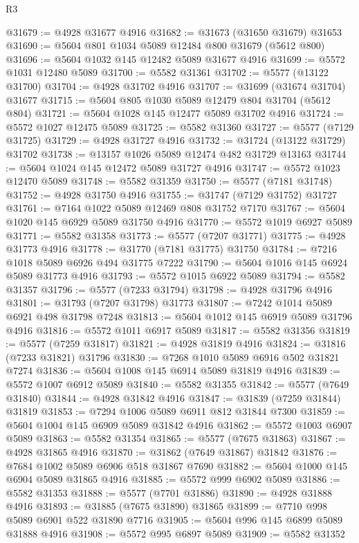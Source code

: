 \begin{lexlean}{R3}
\begin{coremodule}
@31679 := @4928 @31677 @4916
@31682 := @31673 (@31650 @31679) @31653
@31690 := @5604 @801 @1034 @5089 @12484 @800 @31679 (@5612 @800)
@31696 := @5604 @1032 @145 @12482 @5089 @31677 @4916
@31699 := @5572 @1031 @12480 @5089
@31700 := @5582 @31361
@31702 := @5577 (@13122 @31700)
@31704 := @4928 @31702 @4916
@31707 := @31699 (@31674 @31704) @31677
@31715 := @5604 @805 @1030 @5089 @12479 @804 @31704 (@5612 @804)
@31721 := @5604 @1028 @145 @12477 @5089 @31702 @4916
@31724 := @5572 @1027 @12475 @5089
@31725 := @5582 @31360
@31727 := @5577 (@7129 @31725)
@31729 := @4928 @31727 @4916
@31732 := @31724 (@13122 @31729) @31702
@31738 := @13157 @1026 @5089 @12474 @482 @31729 @13163
@31744 := @5604 @1024 @145 @12472 @5089 @31727 @4916
@31747 := @5572 @1023 @12470 @5089
@31748 := @5582 @31359
@31750 := @5577 (@7181 @31748)
@31752 := @4928 @31750 @4916
@31755 := @31747 (@7129 @31752) @31727
@31761 := @7164 @1022 @5089 @12469 @808 @31752 @7170
@31767 := @5604 @1020 @145 @6929 @5089 @31750 @4916
@31770 := @5572 @1019 @6927 @5089
@31771 := @5582 @31358
@31773 := @5577 (@7207 @31771)
@31775 := @4928 @31773 @4916
@31778 := @31770 (@7181 @31775) @31750
@31784 := @7216 @1018 @5089 @6926 @494 @31775 @7222
@31790 := @5604 @1016 @145 @6924 @5089 @31773 @4916
@31793 := @5572 @1015 @6922 @5089
@31794 := @5582 @31357
@31796 := @5577 (@7233 @31794)
@31798 := @4928 @31796 @4916
@31801 := @31793 (@7207 @31798) @31773
@31807 := @7242 @1014 @5089 @6921 @498 @31798 @7248
@31813 := @5604 @1012 @145 @6919 @5089 @31796 @4916
@31816 := @5572 @1011 @6917 @5089
@31817 := @5582 @31356
@31819 := @5577 (@7259 @31817)
@31821 := @4928 @31819 @4916
@31824 := @31816 (@7233 @31821) @31796
@31830 := @7268 @1010 @5089 @6916 @502 @31821 @7274
@31836 := @5604 @1008 @145 @6914 @5089 @31819 @4916
@31839 := @5572 @1007 @6912 @5089
@31840 := @5582 @31355
@31842 := @5577 (@7649 @31840)
@31844 := @4928 @31842 @4916
@31847 := @31839 (@7259 @31844) @31819
@31853 := @7294 @1006 @5089 @6911 @812 @31844 @7300
@31859 := @5604 @1004 @145 @6909 @5089 @31842 @4916
@31862 := @5572 @1003 @6907 @5089
@31863 := @5582 @31354
@31865 := @5577 (@7675 @31863)
@31867 := @4928 @31865 @4916
@31870 := @31862 (@7649 @31867) @31842
@31876 := @7684 @1002 @5089 @6906 @518 @31867 @7690
@31882 := @5604 @1000 @145 @6904 @5089 @31865 @4916
@31885 := @5572 @999 @6902 @5089
@31886 := @5582 @31353
@31888 := @5577 (@7701 @31886)
@31890 := @4928 @31888 @4916
@31893 := @31885 (@7675 @31890) @31865
@31899 := @7710 @998 @5089 @6901 @522 @31890 @7716
@31905 := @5604 @996 @145 @6899 @5089 @31888 @4916
@31908 := @5572 @995 @6897 @5089
@31909 := @5582 @31352

\end{coremodule}
\end{lexlean}
